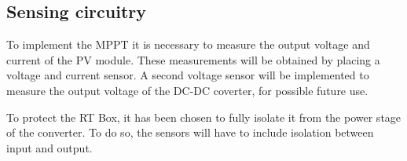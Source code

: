 
\subsection{Sensing circuitry} \label{sensors}
To implement the MPPT it is necessary to measure the output voltage and current of the PV module. These measurements will be obtained by placing a voltage and current sensor. A second voltage sensor will be implemented to measure the output voltage of the DC-DC coverter, for possible future use. 

To protect the RT Box, it has been chosen to fully isolate it from the power stage of the converter. To do so, the sensors will have to include isolation between input and output.  



 
